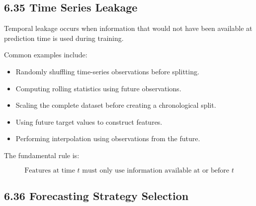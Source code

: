 \documentclass[
  10pt,
  letterpaper,
]{article}
\begin{document}
\hypertarget{time-series-leakage}{%
\subsection{6.35 Time Series Leakage}\label{time-series-leakage}}

Temporal leakage occurs when information that would not have been available at
prediction time is used during training.

Common examples include:

\begin{itemize}
\item Randomly shuffling time-series observations before splitting.
\item Computing rolling statistics using future observations.
\item Scaling the complete dataset before creating a chronological split.
\item Using future target values to construct features.
\item Performing interpolation using observations from the future.
\end{itemize}

The fundamental rule is:

\[
\boxed{\text{Features at time }t\text{ must only use information available at or before }t}
\]

\hypertarget{forecasting-strategy-selection}{%
\subsection{6.36 Forecasting Strategy Selection}\label{forecasting-strategy-selection}}
\end{document}
